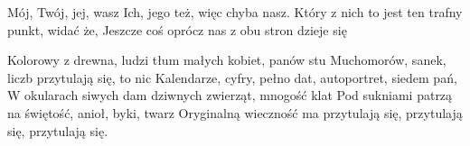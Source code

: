 \documentclass[../../../songbook.tex]{subfiles}
\begin{document}
\-\hspace{1cm} Mój, Twój, jej, wasz						  \newline
\-\hspace{1cm} Ich, jego też, więc chyba nasz.				\newline	
\-\hspace{1cm} Który z nich to jest ten trafny punkt, widać że,	\newline		
\-\hspace{1cm} Jeszcze coś oprócz nas z obu stron dzieje się	\newline	

Kolorowy z drewna, ludzi tłum małych kobiet, panów stu	\quad{} \newline
Muchomorów, sanek, liczb przytulają się, to nic			\quad\quad\quad\quad\quad{} \newline
Kalendarze, cyfry, pełno dat, autoportret, siedem pań,	\newline
W okularach siwych dam dziwnych zwierząt, mnogość klat	\newline
Pod sukniami patrzą na świętość, anioł, byki, twarz	\newline
Oryginalną wieczność ma przytulają się, przytulają się, przytulają się.
\end{document}
